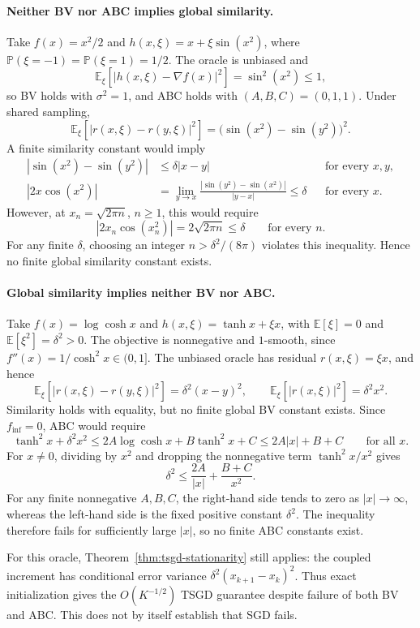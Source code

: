 \paragraph{Neither BV nor ABC implies global similarity.}
Take $f(x)=x^2/2$ and $h(x,\xi)=x+\xi\sin(x^2)$, where
$\mathbb P(\xi=-1)=\mathbb P(\xi=1)=1/2$. The oracle is
unbiased and
\[
\mathbb E_\xi[|h(x,\xi)-\nabla f(x)|^2]
 =\sin^2(x^2)\leq1,
\]
so BV holds with $\sigma^2=1$, and ABC holds with $(A,B,C)=(0,1,1)$.
Under shared sampling,
\[
\mathbb E_\xi[|r(x,\xi)-r(y,\xi)|^2]
 =\bigl(\sin(x^2)-\sin(y^2)\bigr)^2.
\]
A finite similarity constant would imply
\[
\begin{aligned}
|\sin(x^2)-\sin(y^2)|&\leq\delta|x-y|
   &&\text{for every }x,y,\\
|2x\cos(x^2)|
 &=\lim_{y\to x}\frac{|\sin(y^2)-\sin(x^2)|}{|y-x|}
 \leq\delta &&\text{for every }x.
\end{aligned}
\]
However, at $x_n=\sqrt{2\pi n}$, $n\geq1$, this would require
\[
|2x_n\cos(x_n^2)|=2\sqrt{2\pi n}\leq\delta
\qquad\text{for every }n.
\]
For any finite $\delta$, choosing an integer $n>\delta^2/(8\pi)$
violates this inequality. Hence no finite global similarity constant
exists.

\paragraph{Global similarity implies neither BV nor ABC.}
Take $f(x)=\log\cosh x$ and
$h(x,\xi)=\tanh x+\xi x$, with
$\mathbb E[\xi]=0$ and $\mathbb E[\xi^2]=\delta^2>0$.
The objective is nonnegative and $1$-smooth, since
$f''(x)=1/\cosh^2x\in(0,1]$.
The unbiased oracle has residual $r(x,\xi)=\xi x$, and hence
\[
\mathbb E_\xi[|r(x,\xi)-r(y,\xi)|^2]
 =\delta^2(x-y)^2,
\qquad
\mathbb E_\xi[|r(x,\xi)|^2]=\delta^2x^2.
\]
Similarity holds with equality, but no finite global BV constant
exists. Since $f_{\inf}=0$, ABC would require
\[
\tanh^2x+\delta^2x^2
\leq2A\log\cosh x+B\tanh^2x+C
\leq2A|x|+B+C
\qquad\text{for all }x.
\]
For $x\neq0$, dividing by $x^2$ and dropping the nonnegative term
$\tanh^2x/x^2$ gives
\[
\delta^2\leq\frac{2A}{|x|}+\frac{B+C}{x^2}.
\]
For any finite nonnegative $A,B,C$, the right-hand side tends to zero as
$|x|\to\infty$, whereas the left-hand side is the fixed positive
constant $\delta^2$. The inequality therefore fails for sufficiently
large $|x|$, so no finite ABC constants exist.

For this oracle, Theorem~\ref{thm:tsgd-stationarity} still applies:
the coupled increment has conditional error variance
$\delta^2(x_{k+1}-x_k)^2$. Thus exact initialization gives the
$O(K^{-1/2})$ TSGD guarantee despite failure of both BV and ABC.
This does not by itself establish that SGD fails.


